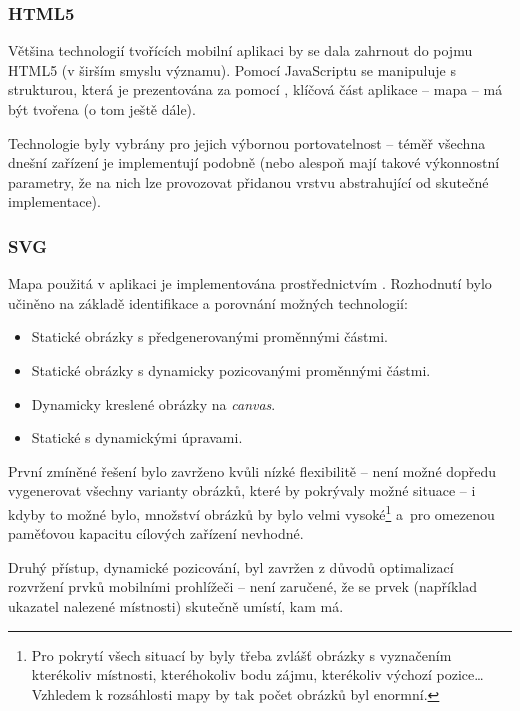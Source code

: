 \subsubsection{HTML5}
Většina technologií tvořících mobilní aplikaci by se dala zahrnout do pojmu HTML5 (v širším smyslu významu). Pomocí JavaScriptu se manipuluje s~ strukturou, která je prezentována za pomocí , klíčová část aplikace -- mapa -- má být tvořena  (o tom ještě dále).

Technologie byly vybrány pro jejich výbornou portovatelnost -- téměř všechna dnešní zařízení je implementují podobně (nebo alespoň mají takové výkonnostní parametry, že na nich lze provozovat přidanou vrstvu abstrahující od skutečné implementace).

\subsubsection{SVG}
Mapa použitá v aplikaci je implementována prostřednictvím . Rozhodnutí bylo učiněno na základě identifikace a porovnání možných technologií:
\begin{itemize}
 \item Statické obrázky s předgenerovanými proměnnými částmi.
 \item Statické obrázky s dynamicky pozicovanými proměnnými částmi.
 \item Dynamicky kreslené obrázky na \textit{canvas}.
 \item Statické  s dynamickými úpravami.
\end{itemize}

První zmíněné řešení bylo zavrženo kvůli nízké flexibilitě -- není možné dopředu vygenerovat všechny varianty obrázků, které by pokrývaly možné situace -- i kdyby to možné bylo, množství obrázků by bylo velmi vysoké\footnote{Pro pokrytí všech situací by byly třeba zvlášť obrázky s vyznačením kterékoliv místnosti, kteréhokoliv bodu zájmu, kterékoliv výchozí pozice\dots Vzhledem k rozsáhlosti mapy by tak počet obrázků byl enormní.} a~pro omezenou paměťovou kapacitu cílových zařízení nevhodné.

Druhý přístup, dynamické pozicování, byl zavržen z důvodů optimalizací rozvržení prvků mobilními prohlížeči -- není zaručené, že se prvek (například ukazatel nalezené místnosti) skutečně umístí, kam má.

